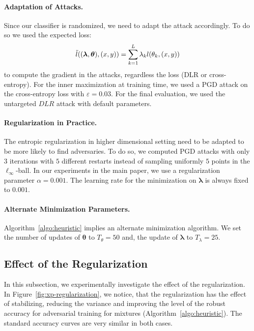 \paragraph{Adaptation of Attacks.} Since our classifier is randomized, we need to adapt the attack accordingly. To do so we used the expected loss:
\begin{align*}
\Tilde{l}\left((\bm{\lambda},\bm{\theta}),(x,y)\right) = \sum_{k=1}^L \lambda_k l(\theta_k,(x,y))
\end{align*}
to compute the gradient in the attacks, regardless the loss (DLR or cross-entropy). For the inner maximization at training time, we used a PGD attack on the cross-entropy loss with $\varepsilon=0.03$. For the final evaluation, we used the untargeted $DLR$ attack with default parameters.
\paragraph{Regularization in Practice.} The entropic regularization in higher dimensional setting need to be adapted to be more likely to find adversaries. To do so, we computed PGD attacks with only $3$ iterations with $5$ different restarts instead of sampling uniformly $5$ points  in the $\ell_\infty$-ball. In our experiments in the main paper, we use a regularization parameter $\alpha=0.001$. The learning rate for the minimization on $\bm{\lambda}$ is always fixed to $0.001$. 
\paragraph{Alternate Minimization Parameters.} Algorithm~\ref{algo:heuristic} implies an alternate minimization algorithm. We set the number of updates of $\bm{\theta}$ to $T_\theta = 50$ and, the update of $\bm{\lambda}$ to $T_\lambda = 25$. 

\subsection{Effect of the Regularization}
In this subsection, we experimentally investigate the effect of the regularization. In Figure~\ref{fig:xp-regularization}, we notice, that the regularization has the effect of stabilizing, reducing the variance and improving the level of the robust accuracy for adversarial training for mixtures (Algorithm~\ref{algo:heuristic}). The standard accuracy curves are very similar in both cases.


